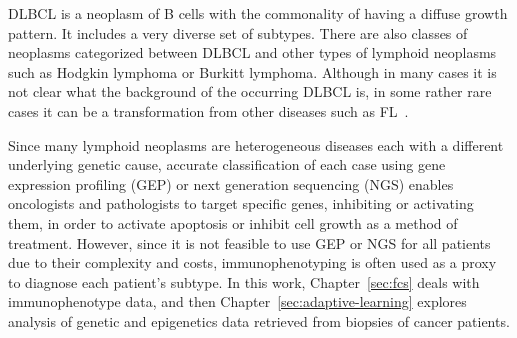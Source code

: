 DLBCL is a neoplasm of B cells with the commonality of having a diffuse growth pattern. It includes a very diverse set of subtypes. There are also classes of neoplasms categorized between DLBCL and other types of lymphoid neoplasms such as Hodgkin lymphoma or Burkitt lymphoma. Although in many cases it is not clear what the background of the occurring DLBCL is, in some rather rare cases it can be a transformation from other diseases such as FL~\cite[Ch. 31, 33]{hoffbrand2016postgraduate}.

Since many lymphoid neoplasms are heterogeneous diseases each with a different underlying genetic cause, accurate classification of each case using gene expression profiling (GEP) or next generation sequencing (NGS) enables oncologists and pathologists to target specific genes, inhibiting or activating them, in order to activate apoptosis or inhibit cell growth as a method of treatment. However, since it is not feasible to use GEP or NGS for all patients due to their complexity and costs, immunophenotyping is often used as a proxy to diagnose each patient's subtype. In this work, Chapter~\ref{sec:fcs} deals with immunophenotype data, and then Chapter~\ref{sec:adaptive-learning} explores analysis of genetic and epigenetics data retrieved from biopsies of cancer patients.
